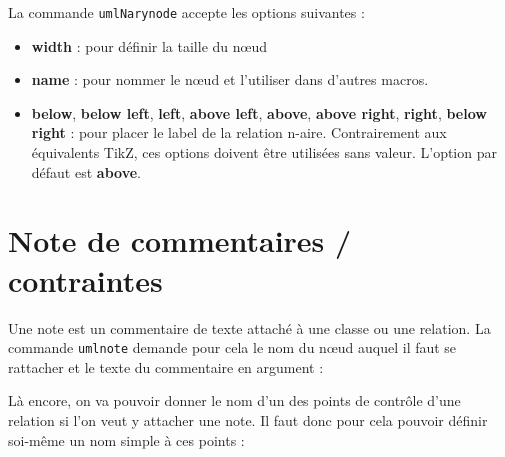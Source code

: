 \documentclass[a4paper,11pt]{report}
\newcommand{\inputTikZ}[1]{%
  }%
\newcommand{\inputTikZ}[1]{%
    \texttt{[image: fig/\#1.pdf]}%
  }%
\newcommand{\TikZ}{{\sc TikZ}}
\begin{document}
\medskip

La commande {\tt umlNarynode} accepte les options suivantes :

\begin{itemize}
\item {\bf width} : pour définir la taille du n\oe{}ud
\item {\bf name} : pour nommer le n\oe{}ud et l'utiliser dans d'autres macros.
\item {\bf below}, {\bf below left}, {\bf left}, {\bf above left}, {\bf above}, {\bf above right}, {\bf right}, {\bf below right} : pour placer le label de la relation n-aire. Contrairement aux équivalents \TikZ, ces options doivent être utilisées sans valeur. L'option par défaut est {\bf above}.
\end{itemize}

\section{Note de commentaires / contraintes}\label{s.note}

Une note est un commentaire de texte attaché à une classe ou une relation. La commande {\tt umlnote} demande pour cela le nom du n\oe{}ud auquel il faut se rattacher et le texte du commentaire en argument :

\medskip

\begin{minipage}{0.5\textwidth}

\end{minipage}
\begin{minipage}{0.4\textwidth}
\begin{center}
\inputTikZ{noteclass}
\end{center}
\end{minipage}

\medskip

Là encore, on va pouvoir donner le nom d'un des points de contrôle d'une relation si l'on veut y attacher une note. Il faut donc pour cela pouvoir définir soi-même un nom simple à ces points :

\medskip

\begin{minipage}{0.6\textwidth}

\end{minipage}
\begin{minipage}{0.4\textwidth}
\begin{center}
\inputTikZ{noterelation}
\end{center}
\end{minipage}
\end{document}
